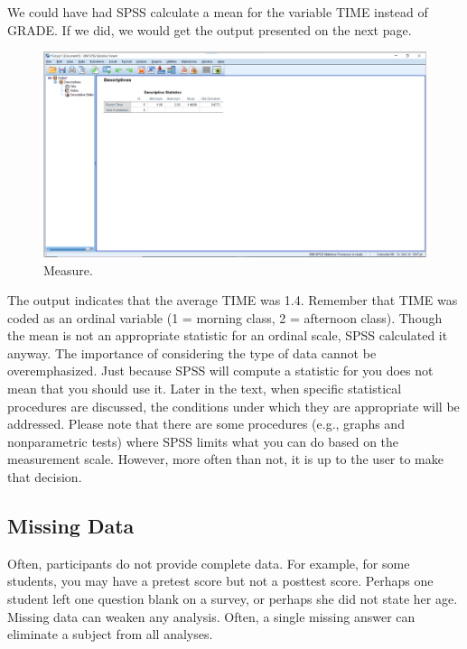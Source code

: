 \documentclass[
]{book}
\begin{document}
We could have had SPSS calculate a mean for the variable TIME instead of GRADE. If we did, we would get the output presented on the next page.

\begin{figure}
\centering
\includegraphics{Descriptive1.png}
\caption{Measure.}
\end{figure}

The output indicates that the average TIME was 1.4. Remember that TIME was coded as an ordinal variable (1 = morning class, 2 = afternoon class). Though the mean is not an appropriate statistic for an ordinal scale, SPSS calculated it anyway. The importance of considering the type of data cannot be overemphasized. Just because SPSS will compute a statistic for you does not mean that you should use it. Later in the text, when specific statistical procedures are discussed, the conditions under which they are appropriate will be addressed. Please note that there are some procedures (e.g., graphs and nonparametric tests) where SPSS limits what you can do based on the measurement scale. However, more often than not, it is up to the user to make that decision.

\hypertarget{missing-data}{%
\subsection{Missing Data}\label{missing-data}}

Often, participants do not provide complete data. For example, for some students, you may have a pretest score but not a posttest score. Perhaps one student left one question blank on a survey, or perhaps she did not state her age. Missing data can weaken any analysis. Often, a single missing answer can eliminate a subject from all analyses.
\end{document}
